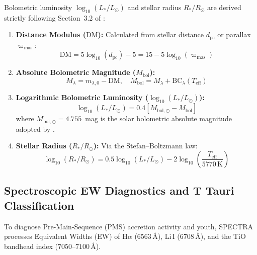 \documentclass[preprints,article,submit,moreauthors,pdftex]{Definitions/mdpi}
\begin{document}
Bolometric luminosity $\log_{10}(L_*/L_\odot)$ and stellar radius $R_*/R_\odot$ are derived strictly following Section~3.2 of \citet{bell2014pre}:
\begin{enumerate}
    \item \textbf{Distance Modulus ($\text{DM}$):} Calculated from stellar distance $d_{\text{pc}}$ or parallax $\varpi_{\text{mas}}$:
    \begin{equation}
        \text{DM} = 5 \log_{10}(d_{\text{pc}}) - 5 = 15 - 5 \log_{10}(\varpi_{\text{mas}})
        \label{eq:dm}
    \end{equation}
    \item \textbf{Absolute Bolometric Magnitude ($M_{\text{bol}}$):}
    \begin{equation}
        M_\lambda = m_{\lambda,0} - \text{DM}, \quad M_{\text{bol}} = M_\lambda + \text{BC}_\lambda(T_{\text{eff}})
        \label{eq:mbol}
    \end{equation}
    \item \textbf{Logarithmic Bolometric Luminosity ($\log_{10}(L_*/L_\odot)$):}
    \begin{equation}
        \log_{10}(L_*/L_\odot) = 0.4 \left[ M_{\text{bol},\odot} - M_{\text{bol}} \right]
        \label{eq:logl}
    \end{equation}
    where $M_{\text{bol},\odot} = 4.755$~mag is the solar bolometric absolute magnitude adopted by \citet{bell2014pre}.
    \item \textbf{Stellar Radius ($R_*/R_\odot$):} Via the Stefan--Boltzmann law:
    \begin{equation}
        \log_{10}(R_*/R_\odot) = 0.5 \log_{10}(L_*/L_\odot) - 2 \log_{10}\left( \frac{T_{\text{eff}}}{5770\,\text{K}} \right)
        \label{eq:radius}
    \end{equation}
\end{enumerate}


\subsection{Spectroscopic EW Diagnostics and T Tauri Classification}
\label{sec:spectroscopic}

To diagnose Pre-Main-Sequence (PMS) accretion activity and youth, \textsc{SPECTRA} processes Equivalent Widths (EW) of $\text{H}\alpha$ ($6563\,\text{\AA}$), $\text{Li}\,\text{I}$ ($6708\,\text{\AA}$), and the $\text{TiO}$ bandhead index ($7050\text{--}7100\,\text{\AA}$).
\end{document}
